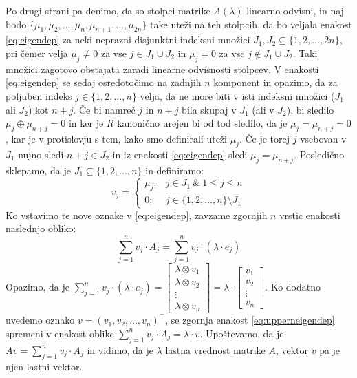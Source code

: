 \documentclass[mat1]{fmfdelo}
\begin{document}
\begin{dokaz}
	Po drugi strani pa denimo, da so stolpci matrike $\bar{A}(\lambda)$ linearno odvisni, in naj bodo $\{\mu_1, \mu_2, \ldots, \mu_n, \mu_{n+1}, \ldots, \mu_{2n}\}$ take uteži na teh stolpcih, da bo veljala enakost \eqref{eq:eigendep} za neki neprazni disjunktni indeksni množici $J_1, J_2 \subseteq \{1, 2, \ldots, 2n\}$, pri čemer velja $\mu_j \neq 0$ za vse $j\in J_1\cup J_2$ in $\mu_j = 0$ za vse $j \notin J_1\cup J_2$. Taki množici zagotovo obstajata zaradi linearne odvisnosti stolpcev. V enakosti \eqref{eq:eigendep} se sedaj osredotočimo na zadnjih $n$ komponent in opazimo, da za poljuben indeks $j \in \{1, 2, \ldots, n\}$ velja, da ne more biti v isti indeksni množici ($J_1$ ali $J_2$) kot $n+j$. Če bi namreč $j$ in $n+j$ bila skupaj v $J_1$ (ali v $J_2$), bi sledilo $\mu_j \oplus \mu_{n+j} = 0$ in ker je $R$ kanonično urejen bi od tod sledilo, da je $\mu_j = \mu_{n+j} = 0$, kar je v protislovju s tem, kako smo definirali uteži $\mu_j$. Če je torej $j$ vsebovan v $J_1$ nujno sledi $n+j \in J_2$ in iz enakosti \eqref{eq:eigendep} sledi $\mu_j = \mu_{n+j}$. Posledično sklepamo, da je $J_1 \subseteq \{1, 2, \ldots, n\}$ in definiramo: $$v_j = \begin{cases}
		\mu_j;& j\in J_1~\&~1\leq j \leq n \\ 
		0;& j\in \{1, 2, \ldots, n\}\setminus J_1
	\end{cases}$$
Ko vstavimo te nove oznake v \eqref{eq:eigendep}, zavzame zgornjih $n$ vrstic enakosti naslednjo obliko: \begin{equation}\label{eq:upperneigendep}
	\sum_{j = 1}^{n} v_j \cdot A_j = \sum_{j = 1}^{n} v_j \cdot (\lambda\cdot e_j)
\end{equation}
Opazimo, da je $ \sum_{j = 1}^{n} v_j \cdot (\lambda\cdot e_j) = \begin{bmatrix}
	\lambda \otimes v_1 \\
	\lambda \otimes v_2 \\
	\vdots \\
	\lambda \otimes v_n
\end{bmatrix} = \lambda \cdot \begin{bmatrix}
	v_1 \\
	v_2 \\
	\vdots \\
	v_n
\end{bmatrix}$.
Ko dodatno uvedemo oznako $v = (v_1, v_2, \ldots, v_n)^\top$, se zgornja enakost \eqref{eq:upperneigendep} spremeni v enakost oblike $\sum_{j = 1}^{n} v_j \cdot A_j = \lambda\cdot v$. Upoštevamo, da je $Av = \sum_{j = 1}^{n} v_j \cdot A_j$ in vidimo, da je $\lambda$ lastna vrednost matrike $A$, vektor $v$ pa je njen lastni vektor.
\end{dokaz}
	
\end{document}
